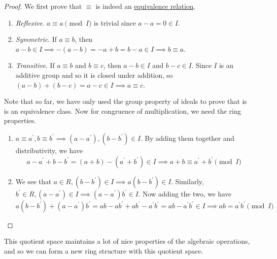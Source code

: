   \begin{proof}
    We first prove that $\equiv$ is indeed an \hyperref[st-def:equivalence_relation]{equivalence relation}. 
    \begin{enumerate}
      \item \textit{Reflexive}. $a \equiv a \pmod{I}$ is trivial since $a - a = 0 \in I$. 
      \item \textit{Symmetric}. If $a \equiv b$, then $a - b \in I \implies -(a - b) = -a + b = b - a \in I \implies b \equiv a$. 
      \item \textit{Transitive}. If $a \equiv b$ and $b \equiv c$, then $a - b \in I$ and $b - c \in I$. Since $I$ is an additive group and so it is closed under addition, so $(a - b) + (b - c) = a - c \in I \implies a \equiv c$. 
    \end{enumerate}
    Note that so far, we have only used the group property of ideals to prove that is is an equivalence class. Now for congruence of multiplication, we need the ring properties. 
    \begin{enumerate}
      \item $a \equiv a^\prime, b \equiv b^\prime \implies (a - a^\prime), (b - b^\prime) \in I$. By adding them together and distributivity, we have 
      \begin{equation}
        a - a^\prime + b - b^\prime = (a + b) - (a^\prime + b^\prime) \in I \implies a + b \equiv a^\prime + b^\prime \pmod{I}
      \end{equation}

      \item We see that $a \in R, (b - b^\prime) \in I \implies a(b - b^\prime) \in I$. Similarly, $b^\prime \in R, (a - a^\prime) \in I \implies (a - a^\prime) b^\prime \in I$. Now adding the two, we have 
      \begin{equation}
        a (b - b^\prime) + (a - a^\prime) b^\prime = ab - ab^\prime + ab^\prime - a^\prime b^\prime = ab - a^\prime b^\prime \in I \implies ab = a^\prime b^\prime \pmod{I}
      \end{equation}
    \end{enumerate}
  \end{proof} 

  This quotient space maintains a lot of nice properties of the algebraic operations, and so we can form a new ring structure with this quotient space.  

